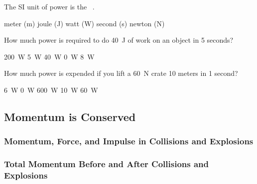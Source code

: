 \documentclass[]{exam}
\begin{document}
\begin{questions}
\question
The SI unit of power is the \fillin\ .

\begin{randomizechoices}
\choice meter (m)
\choice joule (J)
\correctchoice watt (W)
\choice second (s)
\choice newton (N)
\end{randomizechoices}


\question
How much power is required to do \SI{40}{J} of work on an object in 5 seconds?

\begin{randomizechoices}
\choice \SI{200}{W}
\choice \SI{5}{W}
\choice \SI{40}{W}
\choice \SI{0}{W}
\correctchoice \SI{8}{W}
\end{randomizechoices}

\question
How much power is expended if you lift a \SI{60}{N} crate 10 meters in 1 second?

\begin{randomizechoices}
\choice \SI{6}{W}
\choice \SI{0}{W}
\correctchoice \SI{600}{W}
\choice \SI{10}{W}
\choice \SI{60}{W}
\end{randomizechoices}
\end{questions}

\clearpage

\subsection{Momentum is Conserved}

\subsubsection{Momentum, Force, and Impulse in Collisions and Explosions}

\subsubsection{Total Momentum Before and After Collisions and Explosions}
\end{document}

